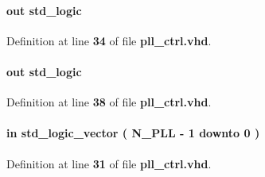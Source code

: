 \paragraph[{phcfg\+\_\+tst}]{ {\bfseries \textcolor{keywordflow}{out}\textcolor{vhdlchar}{ }} {\bfseries \textcolor{comment}{std\+\_\+logic}\textcolor{vhdlchar}{ }} \hspace{0.3cm}{\ttfamily [Port]}}\label{classpll__ctrl_ab5f5d4e9c2405fb83741eedaf2c45f92}


Definition at line {\bf 34} of file {\bf pll\+\_\+ctrl.\+vhd}.

\paragraph[{phcfg\+\_\+updn}]{ {\bfseries \textcolor{keywordflow}{out}\textcolor{vhdlchar}{ }} {\bfseries \textcolor{comment}{std\+\_\+logic}\textcolor{vhdlchar}{ }} \hspace{0.3cm}{\ttfamily [Port]}}\label{classpll__ctrl_a10148149d3d95f09e47cc7f7f11761b5}


Definition at line {\bf 38} of file {\bf pll\+\_\+ctrl.\+vhd}.

\paragraph[{pll\+\_\+lock}]{ {\bfseries \textcolor{keywordflow}{in}\textcolor{vhdlchar}{ }} {\bfseries \textcolor{comment}{std\+\_\+logic\+\_\+vector}\textcolor{vhdlchar}{ }\textcolor{vhdlchar}{(}\textcolor{vhdlchar}{ }\textcolor{vhdlchar}{ }\textcolor{vhdlchar}{ }\textcolor{vhdlchar}{ }{\bfseries {\bf N\+\_\+\+P\+LL}} \textcolor{vhdlchar}{-\/}\textcolor{vhdlchar}{ } \textcolor{vhdldigit}{1} \textcolor{vhdlchar}{ }\textcolor{keywordflow}{downto}\textcolor{vhdlchar}{ }\textcolor{vhdlchar}{ } \textcolor{vhdldigit}{0} \textcolor{vhdlchar}{ }\textcolor{vhdlchar}{)}\textcolor{vhdlchar}{ }} \hspace{0.3cm}{\ttfamily [Port]}}\label{classpll__ctrl_a635da34da757922eff93d5407c0857c9}


Definition at line {\bf 31} of file {\bf pll\+\_\+ctrl.\+vhd}.

